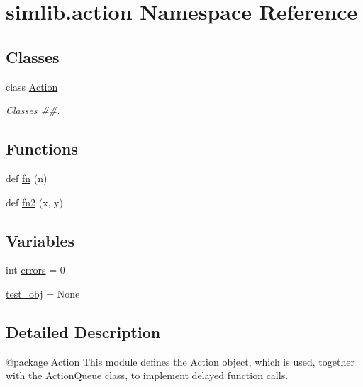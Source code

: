 \hypertarget{namespacesimlib_1_1action}{}\section{simlib.\+action Namespace Reference}
\label{namespacesimlib_1_1action}
\subsection*{Classes}
\begin{DoxyCompactItemize}
\item 
class \mbox{\hyperlink{classsimlib_1_1action_1_1_action}{Action}}
\begin{DoxyCompactList}\small\item\em Classes \#\#. \end{DoxyCompactList}\end{DoxyCompactItemize}
\subsection*{Functions}
\begin{DoxyCompactItemize}
\item 
def \mbox{\hyperlink{namespacesimlib_1_1action_ab7fe3c0b13e6245919ae875f53e402a2}{fn}} (n)
\item 
def \mbox{\hyperlink{namespacesimlib_1_1action_a04debf992e34c2c78decde32950215f8}{fn2}} (x, y)
\end{DoxyCompactItemize}
\subsection*{Variables}
\begin{DoxyCompactItemize}
\item 
int \mbox{\hyperlink{namespacesimlib_1_1action_a7c9b53dfdf7b83201f3b579c0babbaa0}{errors}} = 0
\item 
\mbox{\hyperlink{namespacesimlib_1_1action_a0b9adc670ea622af1a4ac000c4551503}{test\+\_\+obj}} = None
\end{DoxyCompactItemize}


\subsection{Detailed Description}
\begin{DoxyVerb}@package Action
This module defines the Action object, which is used, together with the ActionQueue class,
to implement delayed function calls.
\end{DoxyVerb}
 

